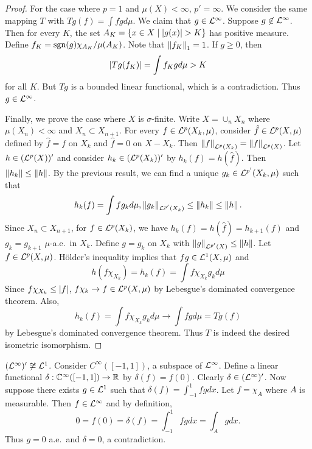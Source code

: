 \begin{proof}
    For the case where $p=1$ and $\mu(X)<\infty$, $p'=\infty$. 
    We consider the same mapping $T$ with $Tg(f) = \int fg d\mu$. 
    We claim that $g\in\mathcal{L}^\infty$. Suppose $g\not\in\mathcal{L}^\infty$. 
    Then for every $K$, the set $A_K = \left\{ x\in X \;\middle\vert\; \left\lvert {g(x)} \right\rvert>K \right\}$ 
    has positive measure. Define $f_K = \operatorname{sgn}(g)\chi_{A_K}/\mu(A_K)$. 
    Note that $\left\lVert {f_K} \right\rVert_1 = 1$. If $g\geq 0$, then 
    \begin{equation*}
        \left\lvert {Tg(f_K)} \right\rvert = \int f_Kgd\mu > K
    \end{equation*}
    for all $K$. But $Tg$ is a bounded linear functional, 
    which is a contradiction. Thus $g\in\mathcal{L}^\infty$. 

    Finally, we prove the case where $X$ is $\sigma$-finite. 
    Write $X = \cup_n X_n$ where $\mu(X_n)<\infty$ and $X_n\subset 
    X_{n+1}$. For every $f\in\mathcal{L}^p(X_k,\mu)$, consider 
    $\hat{f}\in\mathcal{L}^p(X,\mu)$ defined by $\hat{f} = f$ on $X_k$ 
    and $\hat{f} = 0$ on $X-X_k$. Then $\left\lVert {f} \right\rVert_{\mathcal{L}^p(X_k)} 
    = \left\lVert {f} \right\rVert_{\mathcal{L}^p(X)}$. Let $h\in(\mathcal{L}^p(X))'$ and consider 
    $h_k\in (\mathcal{L}^p(X_k))'$ by $h_k(f) = h(\hat{f})$. Then 
    $\left\lVert {h_k} \right\rVert\leq\left\lVert {h} \right\rVert$. By the previous result, we can 
    find a unique $g_k\in\mathcal{L}^{p'}(X_k,\mu)$ such that 
    \begin{equation*}
        h_k(f) = \int f g_k d\mu, \left\lVert {g_k} \right\rVert_{\mathcal{L}^{p'}(X_k)} 
        \leq \left\lVert {h_k} \right\rVert \leq \left\lVert {h} \right\rVert.
    \end{equation*}
    Since $X_n\subset X_{n+1}$, for $f\in\mathcal{L}^p(X_k)$, we have 
    $h_k(f) = h(\hat{f}) = h_{k+1}(f)$ and $g_k = g_{k+1}$ 
    $\mu$-a.e.\ in $X_k$. Define $g = g_k$ on $X_k$ with 
    $\left\lVert {g} \right\rVert_{\mathcal{L}^{p'}(X)}\leq \left\lVert {h} \right\rVert$. Let $f\in\mathcal{L}^p(X,\mu)$. 
    H\"older's inequality implies that $fg\in\mathcal{L}^1(X,\mu)$ and 
    \begin{equation*}
        h(f\chi_{X_k}) = h_k(f) = \int f\chi_{X_k}g_kd\mu
    \end{equation*}
    Since $f\chi_{X_k}\leq \left\lvert {f} \right\rvert$, $f\chi_k\to f\in \mathcal{L}^p(X,\mu)$ 
    by Lebesgue's dominated convergence theorem. Also, 
    \begin{equation*}
        h_k(f) = \int f\chi_{X_k}g_kd\mu \to \int fgd\mu = Tg(f)
    \end{equation*}
    by Lebesgue's dominated convergence theorem. Thus $T$ is 
    indeed the desired isometric isomorphism.
\end{proof}
\begin{remark}
    $(\mathcal{L}^\infty)'\not\cong\mathcal{L}^1$. Consider $C^\infty([-1,1])$, 
    a subspace of $\mathcal{L}^\infty$. Define a linear functional 
    $\delta:\mathbb{C}^\infty([-1,1])\to\mathbb{R}$ by $\delta(f) = f(0)$. 
    Clearly $\delta\in(\mathcal{L}^\infty)'$. Now suppose there exists 
    $g\in\mathcal{L}^1$ such that $\delta(f) = \int_{-1}^{1} fgdx$. 
    Let $f = \chi_A$ where $A$ is measurable. Then 
    $f\in\mathcal{L}^\infty$ and by definition, 
    \begin{equation*}
        0 = f(0) = \delta(f) = \int_{-1}^{1} fgdx = \int_A gdx.
    \end{equation*}
    Thus $g = 0$ a.e.\ and $\delta = 0$, a contradiction.
\end{remark}

